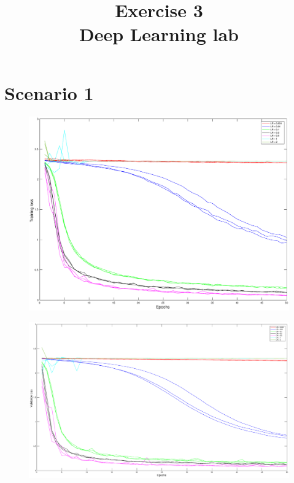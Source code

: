 \documentclass{article}
\title{  Exercise 3 \\
        \large Deep Learning lab}
\date{}
\begin{document}
\maketitle

\section*{Scenario 1}
	\begin{figure}[!htb]
        \centering
        \includegraphics[width=\textwidth]{figures/sc1_tr_loss}
    \end{figure}
    \begin{figure}[!htb]
        \centering
        \includegraphics[width=\textwidth]{figures/sc1_val_loss}
    \end{figure}
\end{document}
